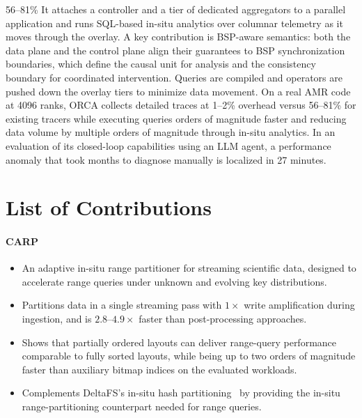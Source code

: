 56–81\%%
It attaches a controller and a tier of dedicated aggregators to a parallel application and runs
SQL-based in-situ analytics over columnar telemetry as it moves through the overlay.
A key contribution is BSP-aware semantics: both the data plane and the control plane align their
guarantees to BSP synchronization boundaries, which define the causal unit for analysis and the
consistency boundary for coordinated intervention.
Queries are compiled and operators are pushed down the overlay tiers to minimize data movement.
On a real AMR code at 4096 ranks, ORCA collects detailed traces at 1--2\% overhead versus 56--81\%
for existing tracers while executing queries orders of magnitude faster and reducing data volume by
multiple orders of magnitude through in-situ analytics.
In an evaluation of its closed-loop capabilities using an LLM agent, a performance anomaly that
took months to diagnose manually is localized in 27 minutes.


\section{List of Contributions}
\label{sec:intro:contribs}

\paragraph{CARP}
\begin{itemize}
  \item An adaptive in-situ range partitioner for streaming scientific data, designed to accelerate
        range queries under unknown and evolving key distributions.

  \item Partitions data in a single streaming pass with $1\times$ write amplification during
        ingestion,
        and is $2.8$--$4.9\times$ faster than post-processing approaches.

  \item Shows that partially ordered layouts can deliver range-query performance comparable to fully
        sorted layouts, while being up to two orders of magnitude faster than auxiliary bitmap indices
        on the evaluated workloads.

  \item Complements DeltaFS's in-situ hash partitioning~\cite{Zheng2018:DeltaFS} by providing the
        in-situ range-partitioning
        counterpart needed for range queries.
\end{itemize}

